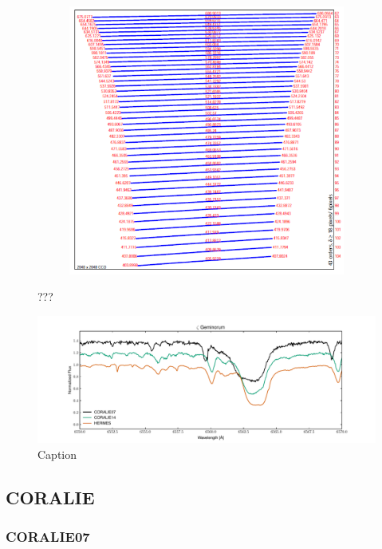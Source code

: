 \begin{figure}[H]
\begin{subfigure}{.45\textwidth}
            \includegraphics[width=\textwidth]{report/images/chap3_methods/echellogram.png}
        \end{subfigure}
        \caption{???}
        \label{3.1a}
        \end{figure}

        \begin{figure}[H]
        \centering
        \includegraphics[width=\textwidth]{report/images/chap3_methods/zetgem_hermes_coralie.pdf}
        \caption{Caption}
        \label{3.1b}
        \end{figure}
    
        \subsection{CORALIE}
            \subsubsection{CORALIE07}
